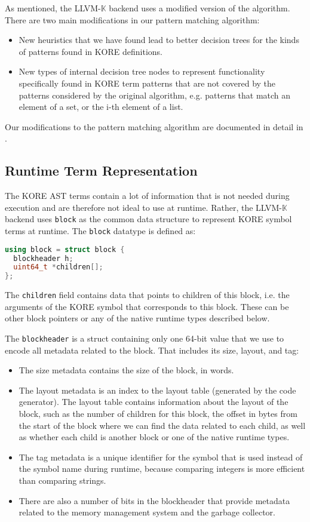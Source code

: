 \documentclass{article}
\theoremstyle{definition}
\newcommand{\K}{$\mathbb{K}$\xspace}
\newcommand{\KL}{LLVM-\K}
\newcommand{\block}{\texttt{block}\xspace}
\newcommand{\children}{\texttt{children}\xspace}
\newcommand{\blockheader}{\texttt{blockheader}\xspace}
\begin{document}
As mentioned, the \KL backend uses a modified version of the algorithm. There are two main modifications in our pattern matching algorithm:
\begin{itemize}
    \item New heuristics that we have found lead to better decision trees for the kinds of patterns found in KORE definitions.
    \item New types of internal decision tree nodes to represent functionality specifically found in KORE term patterns that are not covered by the patterns considered by the original algorithm, e.g. patterns that match an element of a set, or the i-th element of a list.
\end{itemize}
Our modifications to the pattern matching algorithm are documented in detail in .



\subsection{Runtime Term Representation}
The KORE AST terms contain a lot of information that is not needed during execution and are therefore not ideal to use at runtime. Rather, the \KL backend uses \block as the common data structure to represent KORE symbol terms at runtime. The \block datatype is defined as:

\begin{lstlisting}[language=C++, numbers=none,frame=none]
using block = struct block {
  blockheader h;
  uint64_t *children[];
};
\end{lstlisting}

The \children field contains data that points to children of this block, i.e. the arguments of the KORE symbol that corresponds to this block. These can be other block pointers or any of the native runtime types described below.


The \blockheader is a struct containing only one 64-bit value that we use to encode all metadata related to the block. That includes its size, layout, and tag:
\begin{itemize}
    \item The size metadata contains the size of the block, in words.
    \item The layout metadata is an index to the layout table (generated by the code generator). The layout table contains information about the layout of the block, such as the number of children for this block, the offset in bytes from the start of the block where we can find the data related to each child, as well as whether each child is another block or one of the native runtime types.
    \item The tag metadata is a unique identifier for the symbol that is used instead of the symbol name during runtime, because comparing integers is more efficient than comparing strings.
    \item There are also a number of bits in the blockheader that provide metadata related to the memory management system and the garbage collector.
\end{itemize}
\end{document}
